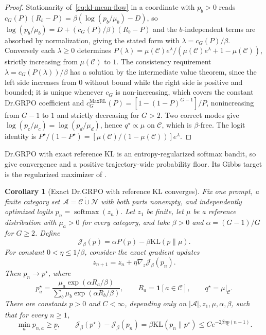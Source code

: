 \documentclass{article}
\newcommand{\enforcehalffinalproseline}{%
  \setlength{\parfillskip}{0pt plus .20\linewidth}}
\newcommand{\1}{\mathbf 1}
\newtheorem{corollary}[lemma]{Corollary}
\theoremstyle{remark}
\theoremstyle{definition}
\theoremstyle{plain}
\begin{document}
\begin{proof}
\enforcehalffinalproseline
Stationarity of~\eqref{eq:kl-mean-flow} in a coordinate with $p_b>0$ reads
$c_G(P)(R_b-P)=\beta(\log(p_b/\mu_b)-D)$, so
$\log(p_b/\mu_b)=D+(c_G(P)/\beta)(R_b-P)$ and the $b$-independent terms are
absorbed by normalization, giving the stated form with $\lambda=c_G(P)/\beta$.
Conversely each $\lambda\ge0$ determines
$P(\lambda)=\mu(\mathcal C)e^\lambda/(\mu(\mathcal C)e^\lambda+1-\mu(\mathcal C))$,
strictly increasing from $\mu(\mathcal C)$ to $1$. The consistency requirement
$\lambda=c_G(P(\lambda))/\beta$ has a solution by the intermediate value
theorem, since the left side increases from $0$ without bound while the right
side is positive and bounded; it is unique whenever $c_G$ is non-increasing,
which covers the constant Dr.GRPO coefficient and
$c_G^{\mathrm{MaxRL}}(P)=[1-(1-P)^{G-1}]/P$, nonincreasing from $G-1$
to $1$ and strictly decreasing for $G>2$.
Two correct modes give $\log(p_c/\mu_c)=\log(p_d/\mu_d)$, hence
$q^\star\propto\mu$ on $\mathcal C$, which is $\beta$-free. The logit identity
is $P^\star/(1-P^\star)=[\mu(\mathcal C)/(1-\mu(\mathcal C))]e^\lambda$.
\end{proof}

Dr.GRPO with exact reference KL is an entropy-regularized softmax bandit,
so \citet[Theorem~5 and Lemma~13]{mei2020softmaxpg} give convergence and a
positive trajectory-wide probability floor. Its Gibbs target is the
regularized maximizer of \citet[Proposition~1]{geist2019regmdp}.

\begin{corollary}[Exact Dr.GRPO with reference KL converges]
\enforcehalffinalproseline
\label{cor:kl-dr-mei-convergence}
Fix one prompt, a finite category set
$\mathcal A=\mathcal C\mathbin{\dot\cup}\mathcal N$ with both parts
nonempty, and independently optimized logits $p_n=\operatorname{softmax}(z_n)$.
Let $z_1$ be finite, let $\mu$ be a reference distribution with
$\mu_a>0$ for every category, and take $\beta>0$ and
$\alpha=(G-1)/G$ for $G\ge2$. Define
\[
 \mathcal J_\beta(p)=\alpha P(p)-\beta\mathrm{KL}(p\|\mu).
\]
For constant $0<\eta\le1/\beta$, consider the exact gradient updates
\begin{equation}
 z_{n+1}=z_n+\eta\nabla_z\mathcal J_\beta(p_n).
 \label{eq:kl-dr-mei-update}
\end{equation}
Then $p_n\to p^\star$, where
\[
 p^\star_a=
 \frac{\mu_a\exp(\alpha R_a/\beta)}
      {\sum_b\mu_b\exp(\alpha R_b/\beta)},
 \qquad R_a=\1[a\in\mathcal C],
 \qquad q^\star=\mu|_{\mathcal C}.
\]
There are constants $\underline p>0$ and $C<\infty$, depending only on
$|\mathcal A|,z_1,\mu,\alpha,\beta$, such that for every $n\ge1$,
\begin{equation}
 \min_a p_{n,a}\ge\underline p,
 \qquad
 \mathcal J_\beta(p^\star)-\mathcal J_\beta(p_n)
 =\beta\mathrm{KL}(p_n\|p^\star)
 \le C e^{-2\beta\eta\underline p(n-1)}.
 \label{eq:kl-dr-mei-rate}
\end{equation}
\end{corollary}
\end{document}
